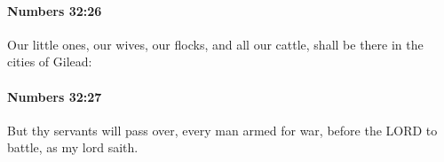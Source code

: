 		\paragraph{Numbers 32:26} %
			\label{NUMBERS-32-26}

			Our little ones, our wives, our flocks, and all our cattle, shall be there in the cities of Gilead:


		\paragraph{Numbers 32:27} %
			\label{NUMBERS-32-27}

			But thy servants will pass over, every man armed for war, before the LORD to battle, as my lord saith.



